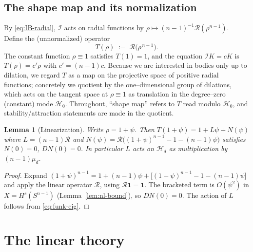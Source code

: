\documentclass[10pt,a4paper]{amsart}
\newtheorem{lemma}[theorem]{Lemma}
\newcommand{\Sph}{S^{n-1}}
\newcommand{\Rad}{\mathcal{R}}
\newcommand{\IB}{\mathcal{I}}
\newcommand{\Hd}[1]{\mathcal{H}_{#1}}
\begin{document}
\subsection{The shape map and its normalization}
By \eqref{eq:IB-radial}, $\IB$ acts on radial functions by
$\rho\mapsto (n-1)^{-1}\Rad(\rho^{n-1})$. Define the (unnormalized) operator
\[
   T(\rho)\;:=\;\Rad\big(\rho^{\,n-1}\big).
\]
The constant function $\rho\equiv 1$ satisfies $T(1)=1$, and the equation
$\IB K = cK$ is $T(\rho)=c'\rho$ with $c'=(n-1)c$. Because we are interested in
bodies only up to dilation, we regard $T$ as a map on the projective space of
positive radial functions; concretely we quotient by the one--dimensional
group of dilations, which acts on the tangent space at $\rho\equiv1$ as
translation in the degree--zero (constant) mode $\Hd 0$. Throughout, ``shape
map'' refers to $T$ read modulo $\Hd 0$, and stability/attraction statements
are made in the quotient.

\begin{lemma}[Linearization]\label{lem:lin}
Write $\rho=1+\psi$. Then $T(1+\psi)=1+L\psi+N(\psi)$ where
$L=(n-1)\Rad$ and $N(\psi)=\Rad\big((1+\psi)^{n-1}-1-(n-1)\psi\big)$
satisfies $N(0)=0$, $DN(0)=0$. In particular $L$ acts on $\Hd d$ as
multiplication by $(n-1)\mu_d$.
\end{lemma}

\begin{proof}
Expand $(1+\psi)^{n-1}=1+(n-1)\psi+\big[(1+\psi)^{n-1}-1-(n-1)\psi\big]$ and
apply the linear operator $\Rad$, using $\Rad\mathbf 1=\mathbf 1$. The
bracketed term is $O(\psi^2)$ in $X=H^s(\Sph)$ (Lemma~\ref{lem:nl-bound}), so
$DN(0)=0$. The action of $L$ follows from \eqref{eq:funk-eig}.
\end{proof}

\section{The linear theory}\label{sec:linear}
\end{document}
